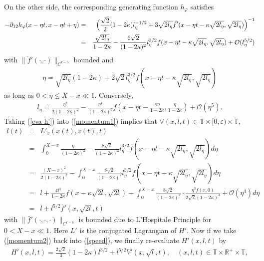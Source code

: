 \documentclass{amsart}
\begin{document}
On the other side, the corresponding generating function $h_{\varphi}$ satisfies
\begin{eqnarray}\label{eva h'}
-\partial_{12}h_{\varphi}(x-\eta t,x-\eta t+\eta)&=&\Big{(}\frac{\sqrt{2}}{2}(1-2\kappa)l_\eta^{-1/2}+3\sqrt{2l_\eta}\tilde{f}'(x-\eta t-\kappa\sqrt{2l_\eta},\sqrt{2l_\eta})\Big{)}^{-1}\nonumber\\
&=&\frac{\sqrt{2l_\eta}}{1-2\kappa}-\frac{6\sqrt{2}}{(1-2\kappa)^2}l_\eta^{3/2}f(x-\eta t-\kappa\sqrt{2l_\eta},\sqrt{2l_\eta})+{\mathcal{O}}(l_\eta^{5/2})
\end{eqnarray}
with $\|\tilde{f}'(\cdot,\cdot)\|_{C^{r-5}}$ bounded and
\begin{eqnarray}
\eta=\sqrt{2l_\eta}(1-2\kappa)+2\sqrt{2}l_\eta^{3/2}f(x-\eta t-\kappa\sqrt{2l_\eta},\sqrt{2l_\eta})
\end{eqnarray}
as long as $0<\eta\leq X-x\ll1$. Conversely,
\begin{eqnarray}
l_\eta=\frac{\eta^2}{2(1-2\kappa)^2}-\frac{\eta^4}{(1-2\kappa)^5}f(x-\eta t-\frac{\kappa\eta}{1-2\kappa},\frac{\eta}{1-2\kappa})+{\mathcal{O}}(\eta^5).
\end{eqnarray}
Taking (\ref{eva h'}) into (\ref{momentum1}) implies that $\forall (x,l,t)\in{\mathbb{T}}\times[0,{\varepsilon})\times{\mathbb{T}}$,
\begin{eqnarray}\label{momentum2}
l(t)&=&L'_v(x(t),v(t),t)\nonumber\\
&=&\int_0^{X-x}\frac{\eta}{(1-2\kappa)^2}-\frac{8\sqrt{2}}{(1-2\kappa)^2}l_\eta^{3/2}f(x-\eta t-\kappa\sqrt{2l_\eta},\sqrt{2l_\eta})d\eta\nonumber\\
&=&\frac{(X-x)^2}{2(1-2\kappa)^2}-\int_0^{X-x}\frac{8\sqrt{2}}{(1-2\kappa)^2}l_\eta^{3/2}f(x-\eta t-\kappa\sqrt{2l_\eta},\sqrt{2l_\eta})d\eta\nonumber\\
&=&l+\frac{4l^2}{1-2\kappa}f(x-\kappa\sqrt{2l},\sqrt{2l})-\int_0^{X-x}\frac{8\sqrt{2}}{(1-2\kappa)^2}\cdot\frac{\eta^3f(x,0)}{2\sqrt{2}(1-2\kappa)^3}+{\mathcal{O}}(\eta^4)d\eta\nonumber\\
&=&l+l^{5/2}\bar{f}'(x,\sqrt{2l},t)
\end{eqnarray}
with $\|\bar{f}'(\cdot,\cdot,\cdot)\|_{C^{r-6}}$ is bounded due to L'Hospitale Principle for $0<X-x\ll1$. Here $L'$ is the conjugated Lagrangian of $H'$. Now if we take (\ref{momentum2}) back into (\ref{speed}), we finally re-evaluate $H'(x,l,t)$ by
\begin{eqnarray}
H'(x,l,t)=\frac{2\sqrt{2}}{3}(1-2\kappa)l^{3/2}+l^{5/2}V'(x,\sqrt{l},t),\quad(x,l,t)\in{\mathbb{T}}\times{\mathbb{R}}^+\times{\mathbb{T}},
\end{eqnarray}
\end{document}
